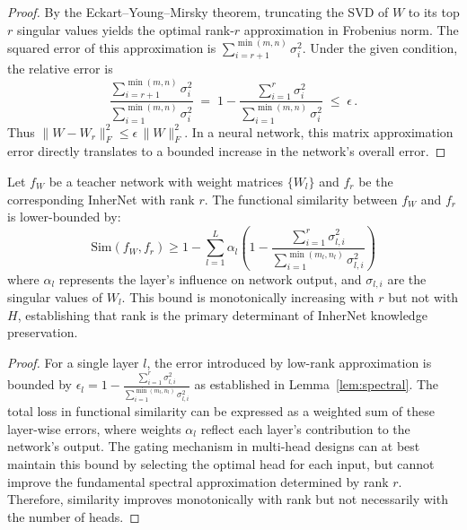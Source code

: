 \documentclass{article} %
\begin{document}
\begin{proof}
By the Eckart–Young–Mirsky theorem, truncating the SVD of $W$ to its top $r$ singular values yields the optimal rank-$r$ approximation in Frobenius norm. The squared error of this approximation is $\sum_{i=r+1}^{\min(m,n)} \sigma_i^2$. Under the given condition, the relative error is 
\[
\frac{\sum_{i=r+1}^{\min(m,n)} \sigma_i^2}{\sum_{i=1}^{\min(m,n)} \sigma_i^2} \;=\; 1 - \frac{\sum_{i=1}^{r} \sigma_i^2}{\sum_{i=1}^{\min(m,n)} \sigma_i^2} \;\le\; \epsilon\,.
\] 
Thus $\|W - W_r\|_F^2 \le \epsilon\,\|W\|_F^2$. In a neural network, this matrix approximation error directly translates to a bounded increase in the network's overall error.
\end{proof}

\begin{proposition}
\label{prop:knowledge-preservation}
Let $f_W$ be a teacher network with weight matrices $\{W_l\}$ and $f_r$ be the corresponding InherNet with rank $r$. The functional similarity between $f_W$ and $f_r$ is lower-bounded by:
\begin{equation}
\text{Sim}(f_W, f_r) \geq 1 - \sum_{l=1}^L \alpha_l \left(1 - \frac{\sum_{i=1}^{r} \sigma_{l,i}^2}{\sum_{i=1}^{\min(m_l,n_l)} \sigma_{l,i}^2}\right)
\end{equation}
where $\alpha_l$ represents the layer's influence on network output, and $\sigma_{l,i}$ are the singular values of $W_l$. This bound is monotonically increasing with $r$ but not with $H$, establishing that rank is the primary determinant of InherNet knowledge preservation.
\end{proposition}

\begin{proof}
For a single layer $l$, the error introduced by low-rank approximation is bounded by $\epsilon_l = 1-\frac{\sum_{i=1}^{r} \sigma_{l,i}^2}{\sum_{i=1}^{\min(m_l,n_l)} \sigma_{l,i}^2}$ as established in Lemma~\ref{lem:spectral}. The total loss in functional similarity can be expressed as a weighted sum of these layer-wise errors, where weights $\alpha_l$ reflect each layer's contribution to the network's output. The gating mechanism in multi-head designs can at best maintain this bound by selecting the optimal head for each input, but cannot improve the fundamental spectral approximation determined by rank $r$. Therefore, similarity improves monotonically with rank but not necessarily with the number of heads.
\end{proof}
\end{document}
